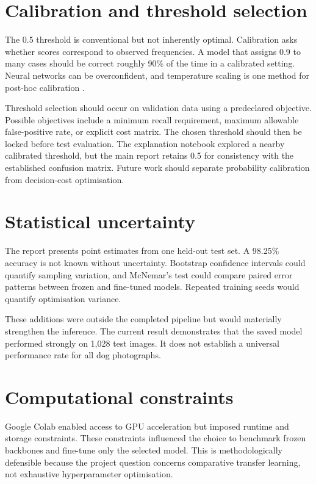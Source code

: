 \section{Calibration and threshold selection}
The 0.5 threshold is conventional but not inherently optimal. Calibration asks whether scores correspond to observed frequencies. A model that assigns 0.9 to many cases should be correct roughly 90\% of the time in a calibrated setting. Neural networks can be overconfident, and temperature scaling is one method for post-hoc calibration \citep{guo2017calibration}.

Threshold selection should occur on validation data using a predeclared objective. Possible objectives include a minimum recall requirement, maximum allowable false-positive rate, or explicit cost matrix. The chosen threshold should then be locked before test evaluation. The explanation notebook explored a nearby calibrated threshold, but the main report retains 0.5 for consistency with the established confusion matrix. Future work should separate probability calibration from decision-cost optimisation.

\section{Statistical uncertainty}
The report presents point estimates from one held-out test set. A 98.25\% accuracy is not known without uncertainty. Bootstrap confidence intervals could quantify sampling variation, and McNemar's test could compare paired error patterns between frozen and fine-tuned models. Repeated training seeds would quantify optimisation variance.

These additions were outside the completed pipeline but would materially strengthen the inference. The current result demonstrates that the saved model performed strongly on 1,028 test images. It does not establish a universal performance rate for all dog photographs.

\section{Computational constraints}
Google Colab enabled access to GPU acceleration but imposed runtime and storage constraints. These constraints influenced the choice to benchmark frozen backbones and fine-tune only the selected model. This is methodologically defensible because the project question concerns comparative transfer learning, not exhaustive hyperparameter optimisation.


